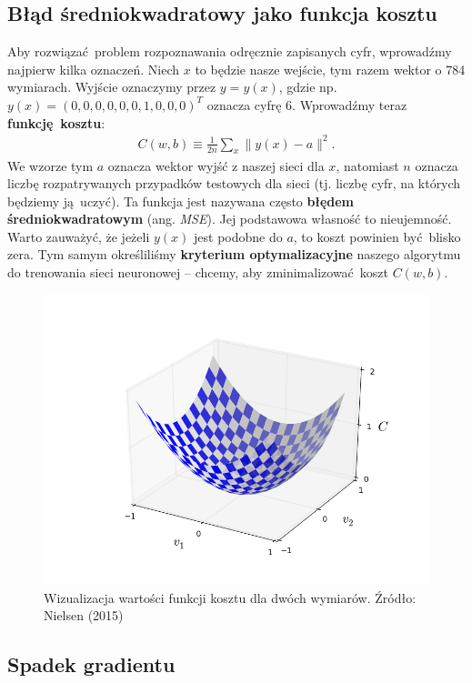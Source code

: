 \documentclass[10pt, oneside]{article}
\theoremstyle{remark}
\begin{document}
\subsection{Błąd średniokwadratowy jako funkcja kosztu}
Aby rozwiązać problem rozpoznawania odręcznie zapisanych cyfr, wprowadźmy najpierw kilka oznaczeń.
Niech $x$ to będzie nasze wejście, tym razem wektor o 784 wymiarach.
Wyjście oznaczymy przez $y=y(x)$, gdzie np. $y(x) = (0, 0, 0, 0, 0, 0, 1, 0, 0, 0)^T$ oznacza cyfrę 6.
Wprowadźmy teraz \textbf{funkcję kosztu}:
\begin{eqnarray}  C(w,b) \equiv
  \frac{1}{2n} \sum_x \| y(x) - a\|^2.
\end{eqnarray}
We wzorze tym $a$ oznacza wektor wyjść z naszej sieci dla $x$, natomiast $n$ oznacza liczbę rozpatrywanych przypadków testowych dla sieci (tj. liczbę cyfr, na których będziemy ją uczyć).
Ta funkcja jest nazywana często \textbf{błędem średniokwadratowym} (ang. \emph{MSE}).
Jej podstawowa własność to nieujemność.
Warto zauważyć, że jeżeli $y(x)$ jest podobne do $a$, to koszt powinien być blisko zera.
Tym samym określiliśmy \textbf{kryterium optymalizacyjne} naszego algorytmu do trenowania sieci neuronowej -- chcemy, aby zminimalizować koszt $C(w, b)$.
\begin{figure}[!htpb]
	\centering
	\includegraphics[width=.7\linewidth]{figures/valley}
	\caption{Wizualizacja wartości funkcji kosztu dla dwóch wymiarów. Źródło: Nielsen (2015)}
\end{figure}


\subsection{Spadek gradientu}
\end{document}
